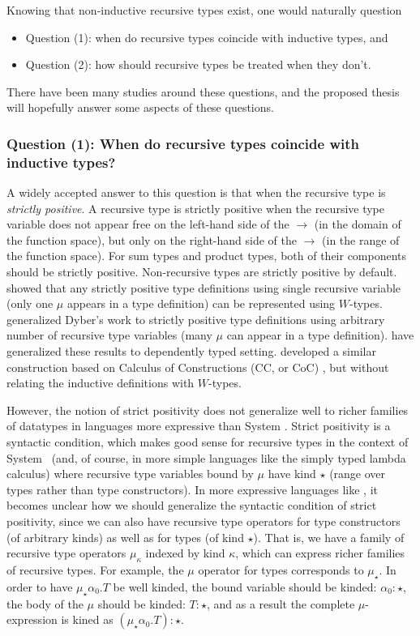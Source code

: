 Knowing that non-inductive recursive types exist, one would naturally question
\begin{itemize}
\item[]Question (1): when do recursive types coincide with inductive types, and
\item[]Question (2): how should recursive types be treated when they don't.
\end{itemize}
There have been many studies around these questions, and the proposed
thesis will hopefully answer some aspects of these questions.

\subsubsection*{Question (1): When do recursive types coincide with inductive types?}

A widely accepted answer to this question is that when the recursive type
is \emph{strictly positive}. A recursive type is strictly positive when
the recursive type variable does not appear free on the left-hand side
of the $\to$ (\ie in the domain of the function space), but only on
the right-hand side of the $\to$ (\ie in the range of the function space).
For sum types and product types, both of their components should be
strictly positive. Non-recursive types are strictly positive by default.
\citet{Dyb97} showed that any strictly positive type definitions using
single recursive variable (\ie only one $\mu$ appears in a type definition)
can be represented using $W$-types.
\citet{AbbAltGha05,AbbAltGha04} generalized Dyber's work \cite{Dyb97} to
strictly positive type definitions using arbitrary number of recursive type
variables (\ie many $\mu$ can appear in a type definition).
\citet{GamHyl03} have generalized these results
\cite{AbbAltGha05,AbbAltGha04,Dyb97} to dependently typed setting.
\citet{CoqPau90} developed a similar construction based on
Calculus of Constructions (CC, or CoC) \cite{CoqHue86}, but without relating
the inductive definitions with $W$-types.

However, the notion of strict positivity does not generalize well to richer
families of datatypes in languages more expressive than System \F.
Strict positivity is a syntactic condition, which makes good sense for
recursive types in the context of System \F\ (and, of course, in more simple
languages like the simply typed lambda calculus) where recursive type variables
bound by $\mu$ have kind $\star$ (\ie range over types rather than
type constructors). In more expressive languages like \Fw, it becomes unclear
how we should generalize the syntactic condition of strict positivity, since
we can also have recursive type operators for type constructors (of arbitrary
kinds) as well as for types (of kind $\star$). That is, we have a family of
recursive type operators $\mu_\kappa$ indexed by kind $\kappa$, which can
express richer families of recursive types. For example, the $\mu$ operator for
types corresponds to $\mu_{\star}$. In order to have $\mu_{\star}\alpha_0.T$
be well kinded, the bound variable should be kinded: $\alpha_0:\star$,
the body of the $\mu$ should be kinded: $T:\star$, and as a result 
the complete $\mu$-expression is kined as $(\mu_{\star}\alpha_0.T):\star$.

